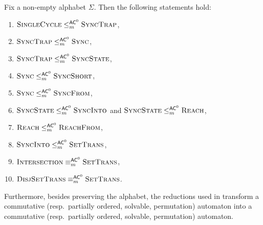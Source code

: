 \begin{proposition}
	\label{compl:prop:reductions}
	Fix a non-empty alphabet $\Sigma$. 
	Then the following statements hold:
	\begin{enumerate}				
		\item \label{compl:prop:reductions:item:SCP_DFAST} $\text{\sc Single\-Cycle} \le_m^{\textup{\textsf{AC}}^0} \textsc{\sc Sync\-Trap}$,
		\item \label{compl:prop:reductions:item:DFAST_DFAS} $\textsc{\sc Sync\-Trap} \le_m^{\textup{\textsf{AC}}^0} \text{\sc Sync}$,
		\item \label{compl:prop:reductions:item:st-ss} $\textsc{\sc Sync\-Trap} \le_m^{\textup{\textsf{AC}}^0} \text{\sc Sync\-State}$,	
		\item \label{compl:prop:reductions:item:DFAS_DFASWS} $\text{\sc Sync} \le_m^{\textup{\textsf{AC}}^0} \text{\sc Sync\-Short}$,
		\item \label{compl:prop:reductions:item:DFAS_SFS} $\text{\sc Sync} \le_m^{\textup{\textsf{AC}}^0} \text{\sc Sync\-From}$,
		\item \label{compl:prop:reductions:item:DFASS_SIS} $\text{\sc Sync\-State} \le_m^{\textup{\textsf{AC}}^0} \textsc{\sc Sync\-Into}$ and $\text{\sc Sync\-State} \le_m^{\textup{\textsf{AC}}^0} \text{\sc Reach}$,		
		\item \label{compl:prop:reductions:item:REACH-REACHF} $\text{\sc Reach} \le_m^{\textup{\textsf{AC}}^0} \text{\sc ReachFrom}$,		
		\item \label{compl:prop:reductions:item:SIS_ST} $\textsc{\sc Sync\-Into} \le_m^{\textup{\textsf{AC}}^0} \textsc{\sc Set\-Trans}$,		
		\item \label{compl:prop:reductions:item:DFAINT_DST}	\label{compl:prop:reductions:item:DFAINT_ST} $\text{\sc Intersection} \equiv_m^{\textup{\textsf{AC}}^0} \textsc{\sc Set\-Trans}$, 		
		\item \label{compl:prop:reductions:item:DST_ST} $\textsc{\sc Disj\-Set\-Trans} \equiv_m^{\textup{\textsf{AC}}^0} \textsc{\sc Set\-Trans}$.
	\end{enumerate} 
	Furthermore, besides preserving the alphabet, the reductions used in   
	transform a commutative (resp.~partially ordered, solvable, permutation) automaton
	into a commutative (resp.~partially ordered, solvable, permutation) automaton.
\end{proposition}
